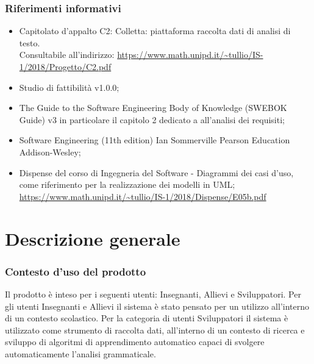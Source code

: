 \subsubsection{Riferimenti informativi}
\begin{itemize}
\item Capitolato d’appalto C2: Colletta: piattaforma raccolta dati di analisi di testo. \\ Consultabile all’indirizzo:
\url{https://www.math.unipd.it/~tullio/IS-1/2018/Progetto/C2.pdf}
\item Studio di fattibilità v1.0.0;
\item The Guide to the Software Engineering Body of Knowledge (SWEBOK Guide) v3 in particolare il capitolo 2 dedicato a all’analisi dei requisiti;
\item Software Engineering (11th edition) Ian Sommerville Pearson Education Addison-Wesley; 
\item Dispense del corso di Ingegneria del Software - Diagrammi dei casi d’uso, come riferimento per la realizzazione dei modelli in UML;
\url{https://www.math.unipd.it/~tullio/IS-1/2018/Dispense/E05b.pdf}
\end{itemize}
\newpage
\section{Descrizione generale}
\subsubsection{Contesto d’uso del prodotto}
Il prodotto è inteso per i seguenti utenti: Insegnanti, Allievi e Sviluppatori.
Per gli utenti Insegnanti e Allievi il sistema è stato pensato per un utilizzo all’interno di un contesto scolastico. Per la categoria di utenti Sviluppatori il sistema è utilizzato come strumento di raccolta dati, all'interno di un contesto di ricerca e sviluppo di algoritmi di apprendimento automatico capaci di svolgere automaticamente l'analisi grammaticale. 
